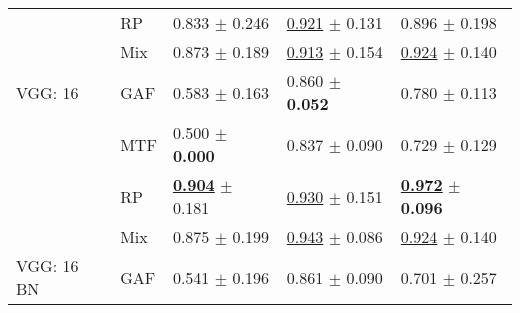 \begin{tabular}{lllll}
 & RP & \textcolor[rgb]{0.1665182547,0.5000000000,0}{0.833} $\pm$ \textcolor[rgb]{0.9410679338,0.0589320662,0}{0.246} & \underline{\textcolor[rgb]{0.1991869919,0.5000000000,0}{0.921}} $\pm$ \textcolor[rgb]{0.4957921792,0.5000000000,0}{0.131} & \textcolor[rgb]{0.2820512821,0.5000000000,0}{0.896} $\pm$ \textcolor[rgb]{0.6330964479,0.3669035521,0}{0.198} \\
 & Mix & \textcolor[rgb]{0.0739091719,0.5000000000,0}{0.873} $\pm$ \textcolor[rgb]{0.7220818610,0.2779181390,0}{0.189} & \underline{\textcolor[rgb]{0.2378048780,0.5000000000,0}{0.913}} $\pm$ \textcolor[rgb]{0.6415115340,0.3584884660,0}{0.154} & \underline{\textcolor[rgb]{0.1794871795,0.5000000000,0}{0.924}} $\pm$ \textcolor[rgb]{0.2698456329,0.5000000000,0}{0.140} \\
VGG: 16 & GAF & \textcolor[rgb]{0.7542297418,0.2457702582,0}{0.583} $\pm$ \textcolor[rgb]{0.6224579299,0.3775420701,0}{0.163} & \textcolor[rgb]{0.5110864745,0.4889135255,0}{0.860} $\pm$ \textbf{\textcolor[rgb]{0.0000000000,0.5000000000,0}{0.052}} & \textcolor[rgb]{0.7086247086,0.2913752914,0}{0.780} $\pm$ \textcolor[rgb]{0.1071119150,0.5000000000,0}{0.113} \\
 & MTF & \textcolor[rgb]{0.9501335708,0.0498664292,0}{0.500} $\pm$ \textbf{\textcolor[rgb]{0.0000000000,0.5000000000,0}{0.000}} & \textcolor[rgb]{0.6260162602,0.3739837398,0}{0.837} $\pm$ \textcolor[rgb]{0.2377009274,0.5000000000,0}{0.090} & \textcolor[rgb]{0.8974358974,0.1025641026,0}{0.729} $\pm$ \textcolor[rgb]{0.2017357855,0.5000000000,0}{0.129} \\
 & RP & \underline{\textbf{\textcolor[rgb]{0.0000000000,0.5000000000,0}{0.904}}} $\pm$ \textcolor[rgb]{0.6937384685,0.3062615315,0}{0.181} & \underline{\textcolor[rgb]{0.1524390244,0.5000000000,0}{0.930}} $\pm$ \textcolor[rgb]{0.6254081161,0.3745918839,0}{0.151} & \underline{\textbf{\textcolor[rgb]{0.0000000000,0.5000000000,0}{0.972}}} $\pm$ \textbf{\textcolor[rgb]{0.0000000000,0.5000000000,0}{0.096}} \\
 & Mix & \textcolor[rgb]{0.0685663402,0.5000000000,0}{0.875} $\pm$ \textcolor[rgb]{0.7623521573,0.2376478427,0}{0.199} & \underline{\textcolor[rgb]{0.0853658537,0.5000000000,0}{0.943}} $\pm$ \textcolor[rgb]{0.2161475738,0.5000000000,0}{0.086} & \underline{\textcolor[rgb]{0.1794871795,0.5000000000,0}{0.924}} $\pm$ \textcolor[rgb]{0.2698456329,0.5000000000,0}{0.140} \\
VGG: 16 BN & GAF & \textcolor[rgb]{0.8539626002,0.1460373998,0}{0.541} $\pm$ \textcolor[rgb]{0.7491692816,0.2508307184,0}{0.196} & \textcolor[rgb]{0.5066518847,0.4933481153,0}{0.861} $\pm$ \textcolor[rgb]{0.2377250888,0.5000000000,0}{0.090} & \textcolor[rgb]{1.0000000000,0.0000000000,0}{0.701} $\pm$ \textcolor[rgb]{1.0000000000,0.0000000000,0}{0.257} \\

\end{tabular}
